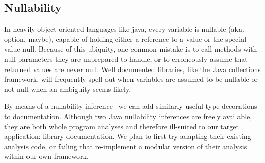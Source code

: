 \subsection{Nullability}
\label{sec:Nullability}

In heavily object oriented languages like java, every variable is nullable
(aka. option, maybe), capable of holding either a reference to a value or the
special value null.  Because of this ubiquity, one common mistake is to call
methods with null parameters they are unprepared to handle, or to erroneously
assume that returned values are never null.  Well documented libraries, like
the Java collections framework, will frequently spell out when variables are
assumed to be nullable or not-null when an ambiguity seems likely.

By means of a nullability inference~\cite{NIT,NonNullTypeInference} we can add
similarly useful type decorations to documentation.  Although two Java
nullability inferences are freely available, they are both whole program
analyses and therefore ill-suited to our target application: library
documentation.  We plan to first try adapting their existing analysis code, or
failing that re-implement a modular version of their analysis within our own
framework.
